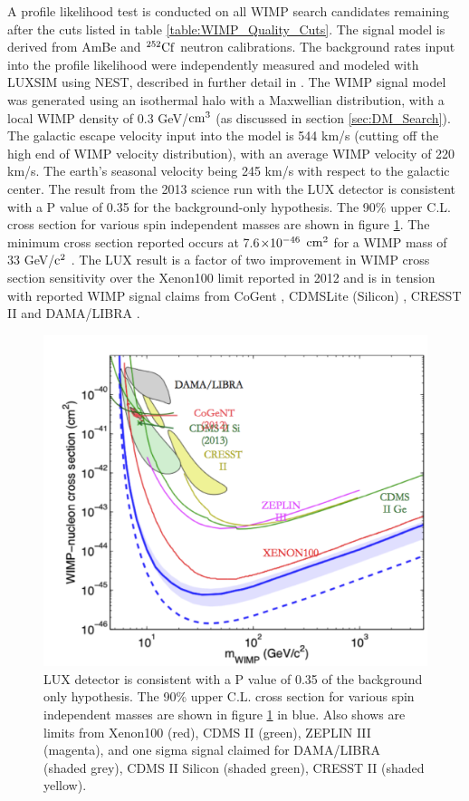 A profile likelihood test is conducted on all WIMP search candidates remaining after the cuts listed in table \ref{table:WIMP_Quality_Cuts}. The signal model is derived from AmBe and $\rm^{252}Cf$ neutron calibrations. The background rates input into the profile likelihood were independently measured and modeled with LUXSIM using NEST, described in further detail in \cite{LUX_BG} \cite{LUX_PRL} \cite{NEST_2013}. The WIMP signal model was generated using an isothermal halo with a Maxwellian distribution, with a local WIMP density of 0.3 GeV/$\rm cm^3$ (as discussed in section \ref{sec:DM_Search}). The galactic escape velocity input into the model is 544 km/s (cutting off the high end of WIMP velocity distribution), with an average WIMP velocity of 220 km/s. The earth's seasonal velocity being 245 km/s with respect to the galactic center. The result from the 2013 science run with the LUX detector is consistent with a P value of 0.35 for the background-only hypothesis. The 90\% upper C.L. cross section for various spin independent masses are shown in figure \ref{fig:LUX_Limit}. The minimum cross section reported occurs at 7.6$\rm\times10^{-46}$ $\rm cm^2$ for a WIMP mass of 33 GeV/$\rm c^2$ \cite{LUX_PRL}. The LUX result is a factor of two improvement in WIMP cross section sensitivity over the Xenon100 limit reported in 2012 \cite{Xenon100} and is in tension with reported WIMP signal claims from CoGent \cite{CoGeNT}, CDMSLite (Silicon) \cite{CDMSlite}, CRESST II \cite{CRESSTII} and DAMA/LIBRA \cite{DAMA}.

 \begin{figure}[h!]\centering
\includegraphics[width=120mm]{Chapter_LUX_Det/LUX_Limit.png}
\caption{LUX detector is consistent with a P value of 0.35 of the background only hypothesis. The 90\% upper C.L. cross section for various spin independent masses are shown in figure \ref{fig:LUX_Limit} in blue. Also shows are limits from Xenon100 (red), CDMS II (green), ZEPLIN III (magenta), and one sigma signal claimed for DAMA/LIBRA (shaded grey), CDMS II Silicon (shaded green), CRESST II (shaded yellow).}
\label{fig:LUX_Limit}
\end{figure}

